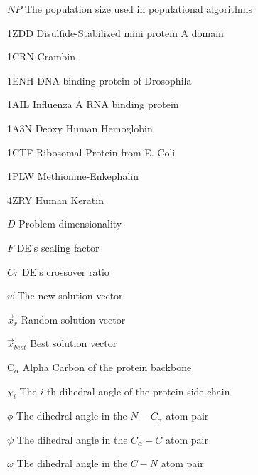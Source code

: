 \documentclass[
  12pt,
  openright,
  oneside,
  a4paper,
  chapter=TITLE,
  section=TITLE,
  brazil,
  english,
]{abntex2}
\begin{document}
\begin{siglas}
\end{siglas}

\begin{simbolos}
  \SingleSpacing
\item[$NP$] The population size used in populational algorithms
\item[1ZDD] Disulfide-Stabilized mini protein A domain
\item[1CRN] Crambin
\item[1ENH] DNA binding protein of Drosophila
\item[1AIL] Influenza A RNA binding protein
\item[1A3N] Deoxy Human Hemoglobin
\item[1CTF] Ribosomal Protein from E. Coli
\item[1PLW] Methionine-Enkephalin
\item[4ZRY] Human Keratin
\item[$D$] Problem dimensionality
\item[$F$] DE's scaling factor
\item[$Cr$] DE's crossover ratio
\item[$\Vec{w}$] The new solution vector
\item[$\Vec{x}_{r}$] Random solution vector
\item[$\Vec{x}_{best}$] Best solution vector
\item[C$_\alpha$] Alpha Carbon of the protein backbone
\item[$\chi_i$] The $i$-th dihedral angle of the protein side chain
\item[$\phi$] The dihedral angle in the $N-C_\alpha$ atom pair
\item[$\psi$] The dihedral angle in the $C_\alpha-C$ atom pair
\item[$\omega$] The dihedral angle in the $C-N$ atom pair
\end{simbolos}
\end{document}
